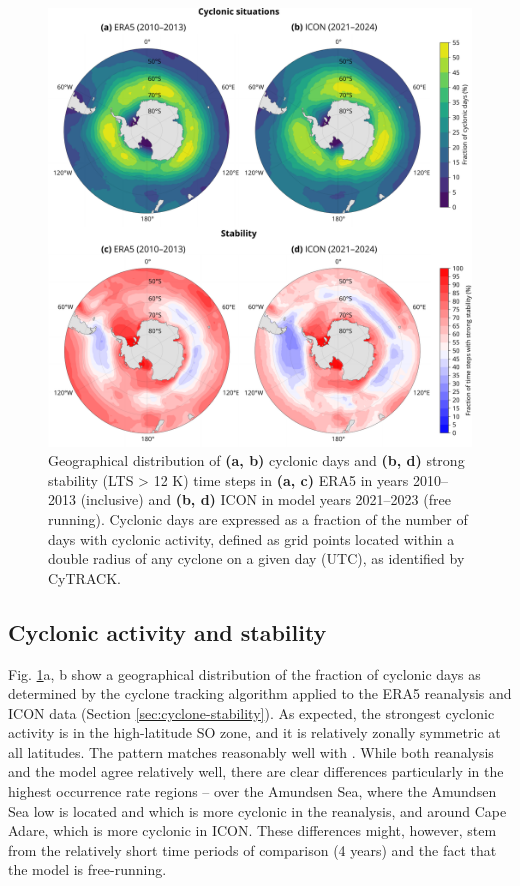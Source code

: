 \documentclass[draft]{agujournal2019}
\begin{document}
\begin{figure}[p!]
\centering
\includegraphics[width=\textwidth]{img/cyc_stab_dist.pdf}
\caption{
Geographical distribution of \textbf{(a, b)} cyclonic days and \textbf{(b, d)}
strong stability (LTS > 12 K) time steps in \textbf{(a, c)} ERA5 in years
2010--2013 (inclusive) and \textbf{(b, d)} ICON in model years 2021--2023 (free
running). Cyclonic days are expressed as a fraction of the number of days with
cyclonic activity, defined as grid points located within a double radius of any
cyclone on a given day (UTC), as identified by CyTRACK.
}
\label{fig:cyclone-stability}
\end{figure}

\subsection{Cyclonic activity and stability}

Fig. \ref{fig:cyclone-stability}a, b show a geographical distribution of the
fraction of cyclonic days as determined by the cyclone tracking algorithm
applied to the ERA5 reanalysis and ICON data (Section
\ref{sec:cyclone-stability}). As expected, the strongest cyclonic activity is
in the high-latitude SO zone, and it is relatively zonally symmetric at all
latitudes.  The pattern matches reasonably well with . While
both reanalysis and the model agree relatively well, there are clear
differences particularly in the highest occurrence rate regions -- over the
Amundsen Sea, where the Amundsen Sea low is located  and which
is more cyclonic in the reanalysis, and around Cape Adare, which is more
cyclonic in ICON. These differences might, however, stem from the relatively
short time periods of comparison (4 years) and the fact that the model is
free-running.
\end{document}
